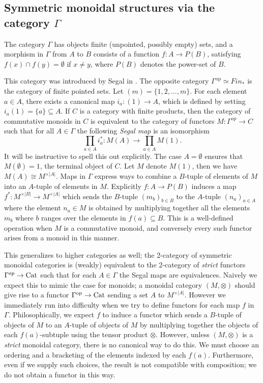 \documentclass{amsart}
\begin{document}
\subsection{Symmetric monoidal structures via the category $\Gamma$}

\begin{definition}
	The category  $\Gamma$ has objects finite (unpointed, possibly empty) sets, and a morphism in $\Gamma$ from $A$ to $B$ consists of a function $f: A \to P(B)$, satisfying $f(x) \cap f(y) = \emptyset$ if $x \neq y$, where $P(B)$ denotes the power-set of $B$. 
\end{definition}

This category was introduced by Segal in \cite{MR0353298}.  The opposite category $\Gamma^\textrm{op} \simeq Fin_*$ is the category of finite pointed sets. Let $(m) = \{ 1, 2, \dots, m\}$. For each element $a \in A$, there exists a canonical map $i_a: (1) \to A$, which is defined by setting $i_a(1) = \{a\} \subseteq A$. If $C$ is a category with finite products, then the category of commutative monoids in $C$ is equivalent to the category of functors $M:\Gamma^{op} \to C$ such that for all $A\in \Gamma$ the following {\em Segal map} is an isomorphism
\begin{equation*}
	\prod_{a \in A} i_a^*: M(A) \to \prod_{a \in A} M(1).
\end{equation*}
It will be instructive to spell this out explicitly. The case $A=\emptyset$ ensures that $M(\emptyset) = 1$, the terminal object of $C$.  Let $M$ denote $M(1)$, then we have $M(A) \cong M^{\times |A|}$. Maps in $\Gamma$ express ways to combine a $B$-tuple of elements of $M$ into an $A$-tuple of elements in $M$. Explicitly $f: A \to P(B)$
induces a map $f^*: M^{\times |B|} \to M^{\times |A|}$ which sends the $B$-tuple $(m_b)_{b \in B}$ to the $A$-tuple $(n_a)_{a \in A}$ where the element $n_a \in M$ is obtained by multiplying together all the elements $m_b$ where $b$ ranges over the elements in $f(a) \subseteq B$. This is a well-defined operation when $M$ is a commutative monoid, and conversely every such functor arises from a monoid in this manner. 

This generalizes to higher categories as well; the 2-category of symmetric monoidal categories is (weakly) equivalent to the 2-category of {\em strict} functors $\Gamma^{op} \to \mathrm{Cat}$ such that for each $A \in \Gamma$ the Segal maps are equivalences. Naively we expect this to mimic the case for monoids; a monoidal category $(M, \otimes)$ should give rise to a functor $\Gamma^\text{op} \to \mathrm{Cat}$ sending a set $A$ to $M^{\times |A|}$. However we immediately run into difficulty when we try to define functors for each map $f$ in $\Gamma$. Philosophically, we expect $f$ to induce a functor which sends a $B$-tuple of objects of $M$ to an $A$-tuple of objects of $M$ by multiplying together the objects of each $f(a)$-subtuple using the tensor product $\otimes$. However, unless $(M, \otimes)$ is a {\em strict} monoidal category, there is no canonical way to do this. We must choose an ordering and a bracketing of the elements indexed by each $f(a)$. Furthermore, even if we supply such choices, the result is not compatible with composition; we do not obtain a functor in this way. 
\end{document}
